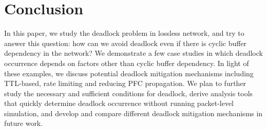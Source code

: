 \section{Conclusion}

In this paper, we study the deadlock problem in lossless network, and try to answer
this question: how can we avoid deadlock even if there is cyclic buffer dependency in
the network? We demonstrate a few case studies in which deadlock occurrence depends on
factors other than cyclic buffer dependency. In light of these examples, we discuss 
potential deadlock mitigation mechanisms including TTL-based, rate limiting and reducing
PFC propagation. We plan to further study the 
necessary and sufficient conditions for deadlock, derive analysis tools that quickly determine
deadlock occurrence without running packet-level simulation, and develop and compare
different deadlock mitigation mechanisms in future work.

